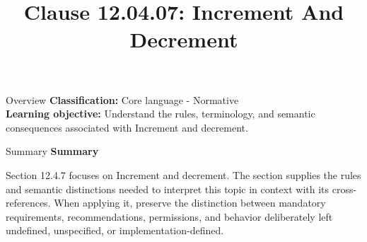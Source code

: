 \documentclass[10pt,letterpaper]{article}
\title{Clause 12.04.07: Increment And Decrement}
\author{}
\date{}
\begin{document}
\maketitle
\begin{CornellOverviewBox}{Overview}
\textbf{Classification:} Core language - Normative\\[2pt]
\textbf{Learning objective:} Understand the rules, terminology, and semantic consequences associated with Increment and decrement.
\end{CornellOverviewBox}\begin{CornellSummaryBox}{Summary}
{\sffamily\bfseries\color{Accent} Summary}\par\vspace{3pt}Section 12.4.7 focuses on Increment and decrement. The section supplies the rules and semantic distinctions needed to interpret this topic in context with its cross-references. When applying it, preserve the distinction between mandatory requirements, recommendations, permissions, and behavior deliberately left undefined, unspecified, or implementation-defined.
\end{CornellSummaryBox}
\end{document}
